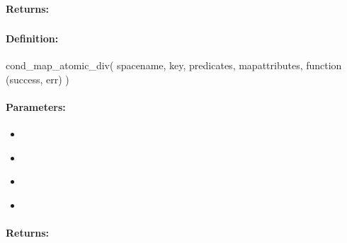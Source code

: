 \paragraph{Returns:}


\pagebreak
\subsubsection{}
\label{api:nodejs:cond_map_atomic_div}


\paragraph{Definition:}
\begin{javascriptcode}
cond_map_atomic_div(
        spacename, key, predicates, mapattributes, function (success, err) {})
\end{javascriptcode}
\paragraph{Parameters:}
\begin{itemize}[noitemsep]
\item {}\\

\item {}\\

\item {}\\

\item {}\\

\end{itemize}

\paragraph{Returns:}


\pagebreak
\subsubsection{}
\label{api:nodejs:map_atomic_mod}


